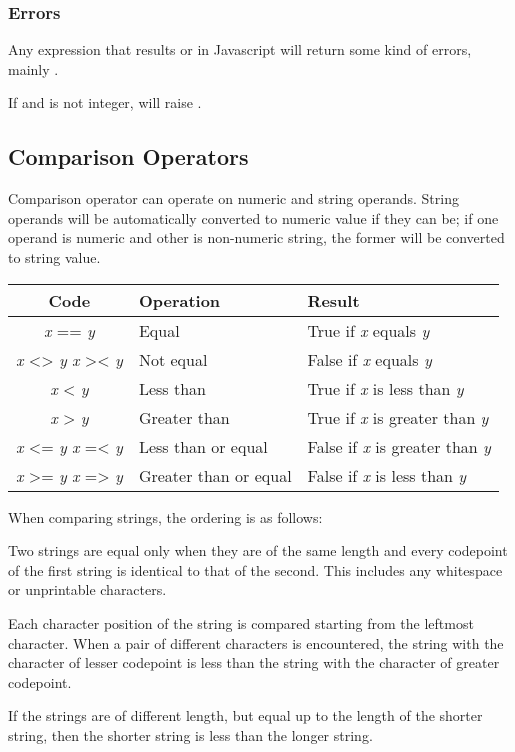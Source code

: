 \subsubsection*{Errors}
\begin{itemlist}
\item Any expression that results  or  in Javascript will return some kind of errors, mainly .
\item If  and  is not integer,  will raise .
\end{itemlist}

\subsection{Comparison Operators}

Comparison operator can operate on numeric and string operands. String operands will be automatically converted to numeric value if they can be; if one operand is numeric and other is non-numeric string, the former will be converted to string value.

\begin{tabulary}{\textwidth}{clL}
Code & Operation & Result \\
\hline
\emph{x} == \emph{y} & Equal & True if \emph{x} equals \emph{y} \\
\emph{x} <\!> \emph{y} \quad \emph{x} >\!< \emph{y} & Not equal & False if \emph{x} equals \emph{y} \\
\emph{x} < \emph{y} & Less than & True if \emph{x} is less than \emph{y} \\
\emph{x} > \emph{y} & Greater than & True if \emph{x} is greater than \emph{y} \\
\emph{x} <\!= \emph{y} \quad \emph{x} =\!< \emph{y} & Less than or equal & False if \emph{x} is greater than \emph{y} \\
\emph{x} >\!= \emph{y} \quad \emph{x} =\!> \emph{y} & Greater than or equal & False if \emph{x} is less than \emph{y} \\
\end{tabulary}

When comparing strings, the ordering is as follows:

\begin{itemlist}
\item Two strings are equal only when they are of the same length and every codepoint of the first string is identical to that of the second. This includes any whitespace or unprintable characters. 
\item Each character position of the string is compared starting from the leftmost character. When a pair of different characters is encountered, the string with the character of lesser codepoint is less than the string with the character of greater codepoint. 
\item If the strings are of different length, but equal up to the length of the shorter string, then the shorter string is less than the longer string.
\end{itemlist}

